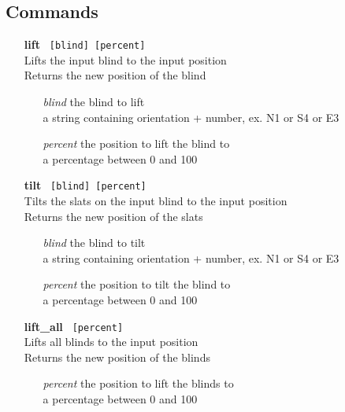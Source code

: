 \documentclass[twoside]{article}
\begin{document}
	
	\subsection{Commands}
	
	\begin{enumerate}
		\item[\bf lift]\verb| [blind] [percent]|\\
		Lifts the input blind to the input position\\
		Returns the new position of the blind
	
		\begin{enumerate}[leftmargin=3\parindent]
			\item[\it blind] the blind to lift\\
			a string containing orientation + number, ex. N1 or S4 or E3
			\item[\it percent] the position to lift the blind to\\
			a percentage between 0 and 100
		\end{enumerate}
	
		\item[\bf tilt]\verb| [blind] [percent]|\\
		Tilts the slats on the input blind to the input position\\
		Returns the new position of the slats
	
		\begin{enumerate}[leftmargin=3\parindent]
			\item[\it blind] the blind to tilt\\
			a string containing orientation + number, ex. N1 or S4 or E3
			\item[\it percent] the position to tilt the blind to\\
			a percentage between 0 and 100
		\end{enumerate}
		
		\item[\bf lift\_all]\verb| [percent]|\\
		Lifts all blinds to the input position\\
		Returns the new position of the blinds
		
		\begin{enumerate}[leftmargin=3\parindent]
			\item[\it percent] the position to lift the blinds to\\
			a percentage between 0 and 100
		\end{enumerate}
		

\end{enumerate}
\end{document}
